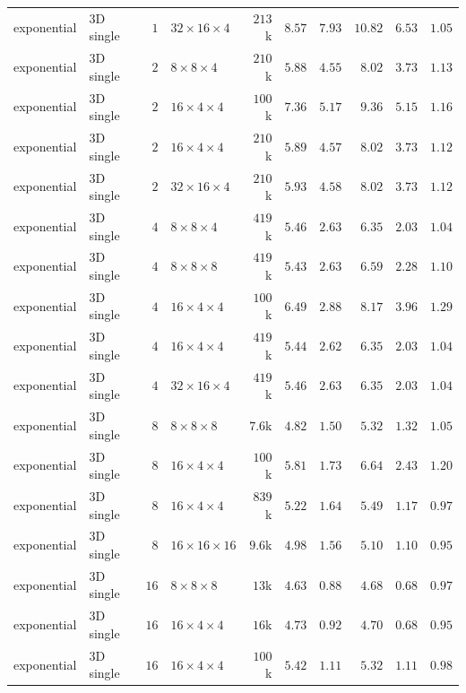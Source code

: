 {\begin{longtable}{llrlrrrrrr}
    exponential & 3D single & $1$ & $32{\times}16{\times}4$ & $213$k & $8.57$ & $7.93$ & $10.82$ & $6.53$ & $1.05$ \\
    exponential & 3D single & $2$ & $8{\times}8{\times}4$ & $210$k & $5.88$ & $4.55$ & $8.02$ & $3.73$ & $1.13$ \\
    exponential & 3D single & $2$ & $16{\times}4{\times}4$ & $100$k & $7.36$ & $5.17$ & $9.36$ & $5.15$ & $1.16$ \\
    exponential & 3D single & $2$ & $16{\times}4{\times}4$ & $210$k & $5.89$ & $4.57$ & $8.02$ & $3.73$ & $1.12$ \\
    exponential & 3D single & $2$ & $32{\times}16{\times}4$ & $210$k & $5.93$ & $4.58$ & $8.02$ & $3.73$ & $1.12$ \\
    exponential & 3D single & $4$ & $8{\times}8{\times}4$ & $419$k & $5.46$ & $2.63$ & $6.35$ & $2.03$ & $1.04$ \\
    exponential & 3D single & $4$ & $8{\times}8{\times}8$ & $419$k & $5.43$ & $2.63$ & $6.59$ & $2.28$ & $1.10$ \\
    exponential & 3D single & $4$ & $16{\times}4{\times}4$ & $100$k & $6.49$ & $2.88$ & $8.17$ & $3.96$ & $1.29$ \\
    exponential & 3D single & $4$ & $16{\times}4{\times}4$ & $419$k & $5.44$ & $2.62$ & $6.35$ & $2.03$ & $1.04$ \\
    exponential & 3D single & $4$ & $32{\times}16{\times}4$ & $419$k & $5.46$ & $2.63$ & $6.35$ & $2.03$ & $1.04$ \\
    exponential & 3D single & $8$ & $8{\times}8{\times}8$ & $7.6$k & $4.82$ & $1.50$ & $5.32$ & $1.32$ & $1.05$ \\
    exponential & 3D single & $8$ & $16{\times}4{\times}4$ & $100$k & $5.81$ & $1.73$ & $6.64$ & $2.43$ & $1.20$ \\
    exponential & 3D single & $8$ & $16{\times}4{\times}4$ & $839$k & $5.22$ & $1.64$ & $5.49$ & $1.17$ & $0.97$ \\
    exponential & 3D single & $8$ & $16{\times}16{\times}16$ & $9.6$k & $4.98$ & $1.56$ & $5.10$ & $1.10$ & $0.95$ \\
    exponential & 3D single & $16$ & $8{\times}8{\times}8$ & $13$k & $4.63$ & $0.88$ & $4.68$ & $0.68$ & $0.97$ \\
    exponential & 3D single & $16$ & $16{\times}4{\times}4$ & $16$k & $4.73$ & $0.92$ & $4.70$ & $0.68$ & $0.95$ \\
    exponential & 3D single & $16$ & $16{\times}4{\times}4$ & $100$k & $5.42$ & $1.11$ & $5.32$ & $1.11$ & $0.98$ \\

\end{longtable}}
